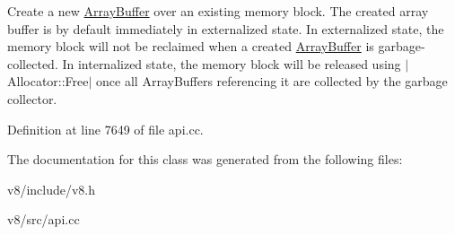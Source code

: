 Create a new \mbox{\hyperlink{classv8_1_1ArrayBuffer}{Array\+Buffer}} over an existing memory block. The created array buffer is by default immediately in externalized state. In externalized state, the memory block will not be reclaimed when a created \mbox{\hyperlink{classv8_1_1ArrayBuffer}{Array\+Buffer}} is garbage-\/collected. In internalized state, the memory block will be released using $\vert$\+Allocator\+::\+Free$\vert$ once all Array\+Buffers referencing it are collected by the garbage collector. 

Definition at line 7649 of file api.\+cc.



The documentation for this class was generated from the following files\+:\begin{DoxyCompactItemize}
\item 
v8/include/v8.\+h\item 
v8/src/api.\+cc\end{DoxyCompactItemize}
